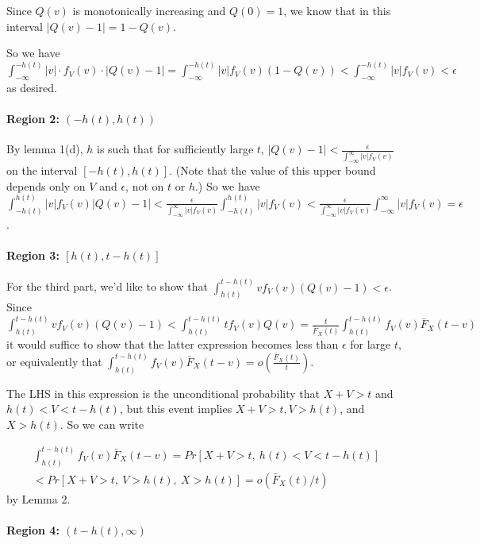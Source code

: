 \documentclass[../neurips_2024.tex]{subfiles}
\begin{document}
Since \(Q(v)\) is monotonically increasing and \(Q(0)=1\), we know that in this interval \(|Q(v)-1| = 1-Q(v)\).

So we have  \(\int_{-\infty}^{-h(t)}|v|\cdot f_V(v) \cdot |Q(v)-1| = \int_{-\infty}^{-h(t)}|v|f_V(v)(1-Q(v)) < \int_{-\infty}^{-h(t)}|v|f_V(v) < \epsilon\) as desired.

\paragraph{Region 2: \texorpdfstring{\((-h(t),h(t))\)}{}}
 By lemma 1(d), \(h\) is such that for sufficiently large \(t\), \(|Q(v)-1|<\frac\epsilon{\int_{-\infty}^\infty |v|f_V(v)}\) on the interval \([-h(t),h(t)]\). (Note that the value of this upper bound depends only on \(V\) and \(\epsilon\), not on \(t\) or \(h\).) So we have \(\int_{-h(t)}^{h(t)}|v|f_V(v)|Q(v)-1| < \frac{\epsilon}{\int_{-\infty}^\infty|v|f_V(v)}\int_{-h(t)}^{h(t)}|v|f_V(v) < \frac{\epsilon}{\int_{-\infty}^\infty|v|f_V(v)}\int_{-\infty}^\infty|v|f_V(v) = \epsilon\).

\paragraph{Region 3: \texorpdfstring{\([h(t),t-h(t)]\)}{}}
 For the third part, we'd like to show that \(\int_{h(t)}^{t-h(t)}vf_V(v)(Q(v)-1)<\epsilon\). Since \(\int_{h(t)}^{t-h(t)}vf_V(v)(Q(v)-1) < \int_{h(t)}^{t-h(t)}tf_V(v)Q(v) = \frac t{\bar F_X(t)}\int_{h(t)}^{t-h(t)}f_V(v)\bar F_X(t-v)\) it would suffice to show that the latter expression becomes less than \(\epsilon\) for large \(t\), or equivalently that \(\int_{h(t)}^{t-h(t)}f_V(v)\bar F_X(t-v) = o\left(\frac{\bar F_X(t)}{t}\right)\).

The LHS in this expression is the unconditional probability that \(X+V>t\) and \(h(t)<V<t-h(t)\), but this event implies \(X+V>t, V>h(t)\), and \(X>h(t)\). So we can write

\begin{multline*}
\int_{h(t)}^{t-h(t)}f_V(v)\bar F_X(t-v) = Pr[X+V>t,\ h(t) < V < t - h(t)]
\\ < Pr[X+V>t,\ V > h(t),\ X > h(t)] = o(\bar F_X(t)/t)
\end{multline*}
by Lemma 2.

\paragraph{Region 4: \texorpdfstring{\((t-h(t),\infty)\)}{}}
\end{document}

